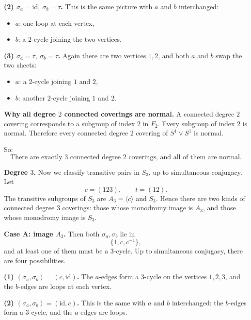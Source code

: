 \documentclass[12pt,a4paper]{article}
\theoremstyle{notespace}
\begin{document}
\medskip

\textbf{(2) \(\sigma_a=\mathrm{id},\ \sigma_b=\tau\).}
This is the same picture with \(a\) and \(b\) interchanged:
\begin{itemize}
	\item \(a\): one loop at each vertex,
	\item \(b\): a \(2\)-cycle joining the two vertices.
\end{itemize}

\medskip

\textbf{(3) \(\sigma_a=\tau,\ \sigma_b=\tau\).}
Again there are two vertices \(1,2\), and both \(a\) and \(b\) swap the two sheets:
\begin{itemize}
	\item \(a\): a \(2\)-cycle joining \(1\) and \(2\),
	\item \(b\): another \(2\)-cycle joining \(1\) and \(2\).
\end{itemize}

\medskip

\textbf{Why all degree \(2\) connected coverings are normal.}
A connected degree \(2\) covering corresponds to a subgroup of index \(2\) in \(F_2\). Every subgroup of index \(2\) is normal. Therefore every connected degree \(2\) covering of \(S^1\vee S^1\) is normal.

So:
\[
\boxed{\text{There are exactly \(3\) connected degree \(2\) coverings, and all of them are normal.}}
\]

\medskip

\textbf{Degree \(3\).}
Now we classify transitive pairs in \(S_3\), up to simultaneous conjugacy. Let
\[
c=(123),\qquad t=(12).
\]
The transitive subgroups of \(S_3\) are \(A_3=\langle c\rangle\) and \(S_3\). Hence there are two kinds of connected degree \(3\) coverings: those whose monodromy image is \(A_3\), and those whose monodromy image is \(S_3\).

\medskip

\textbf{Case A: image \(A_3\).}
Then both \(\sigma_a,\sigma_b\) lie in
\[
\{1,c,c^{-1}\},
\]
and at least one of them must be a \(3\)-cycle. Up to simultaneous conjugacy, there are four possibilities.

\medskip

\textbf{(1) \((\sigma_a,\sigma_b)=(c,\mathrm{id})\).}
The \(a\)-edges form a \(3\)-cycle on the vertices \(1,2,3\), and the \(b\)-edges are loops at each vertex.

\medskip

\textbf{(2) \((\sigma_a,\sigma_b)=(\mathrm{id},c)\).}
This is the same with \(a\) and \(b\) interchanged: the \(b\)-edges form a \(3\)-cycle, and the \(a\)-edges are loops.
\end{document}
